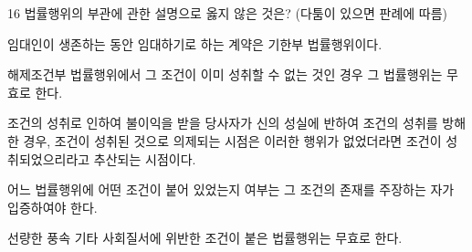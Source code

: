 \begin{question}{16}
법률행위의 부관에 관한 설명으로 옳지 않은 것은? (다툼이 있으면 판례에 따름)
\begin{choices}
  \item 임대인이 생존하는 동안 임대하기로 하는 계약은 기한부 법률행위이다.
  \item 해제조건부 법률행위에서 그 조건이 이미 성취할 수 없는 것인 경우 그 법률행위는 무효로 한다.
  \item 조건의 성취로 인하여 불이익을 받을 당사자가 신의 성실에 반하여 조건의 성취를 방해한 경우, 조건이 성취된 것으로 의제되는 시점은 이러한 행위가 없었더라면 조건이 성취되었으리라고 추산되는 시점이다.
  \item 어느 법률행위에 어떤 조건이 붙어 있었는지 여부는 그 조건의 존재를 주장하는 자가 입증하여야 한다.
  \item 선량한 풍속 기타 사회질서에 위반한 조건이 붙은 법률행위는 무효로 한다.
\end{choices}
\end{question}
